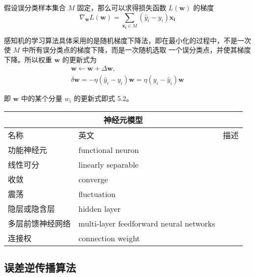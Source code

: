 \documentclass[../studies-ml.tex]{subfiles}
\begin{document}
\begin{enumerate}[I]
        假设误分类样本集合 $M$ 固定，那么可以求得损失函数 $L(\pmb{w})$ 的梯度
        \[ \nabla_{\pmb{w}} L(\pmb{w}) = \sum_{\pmb{x_i} \in M} (\hat{y}_i - y_i) \pmb{x_i} \]

        感知机的学习算法具体采用的是随机梯度下降法，即在最小化的过程中，不是一次使 $M$ 中所有误分类点的梯度下降，而是一次随机选取
        一个误分类点，并使其梯度下降。所以权重 $\pmb{w}$ 的更新式为
        \begin{gather*}
          \pmb{w} \leftarrow \pmb{w} + \Delta \pmb{w}, \\
          \delta \pmb{w} = -\eta (\hat{y}_i - y_i) \pmb{w} = \eta (y_i - \hat{y}_i) \pmb{w}
        \end{gather*}

        即 $\pmb{w}$ 中的某个分量 $w_i$ 的更新式即式 5.2。
\end{enumerate}

\begin{center}
  \begin{tabular}{ |p{3cm}||p{4cm}|p{6cm}|  }
    \hline
    \multicolumn{3}{|c|}{\textbf{神经元模型}}                    \\
    \hline
    名称       & 英文                                      & 描述 \\
    \hline
    功能神经元    & functional neuron                       &    \\
    \hline
    线性可分     & linearly separable                      &    \\
    \hline
    收敛       & converge                                &    \\
    \hline
    震荡       & fluctuation                             &    \\
    \hline
    隐层或隐含层   & hidden layer                            &    \\
    \hline
    多层前馈神经网络 & multi-layer feedforward neural networks &    \\
    \hline
    连接权      & connection weight                       &    \\
    \hline
  \end{tabular}
\end{center}


\subsection{误差逆传播算法}

%
\end{document}
